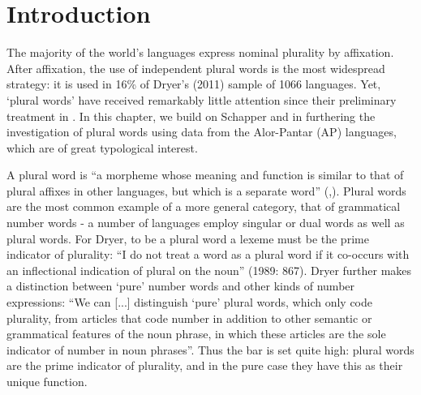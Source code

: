  
\section{Introduction}\label{sec:9:1}%
 
\hypertarget{Toc376962648}{}
The majority of the world's languages express nominal plurality by affixation. After affixation, the use of independent plural words is the most widespread strategy: it is used in 16\% of Dryer's (2011) sample of 1066 languages.\nocite{Dryer2011} Yet, `plural words' have received remarkably little attention since their preliminary treatment in \citet{Dryer1989}. In this chapter, we build on Schapper and \citet{Klamer2011} in furthering the investigation of plural words using data from the Alor-Pantar (AP) languages, which are of great typological interest.

A plural word is ``a morpheme whose meaning and function is similar to that of plural affixes in other languages, but which is a separate word'' (\citealt[865]{Dryer1989},\citealt[166]{Dryer2007}). Plural words are the most common example of a more general category, that of grammatical number words - a number of languages employ singular or dual words as well as plural words. For Dryer, to be a plural word a lexeme must be the prime indicator of plurality: ``I do not treat a word as a plural word if it co-occurs with an inflectional indication of plural on the noun'' (1989: 867). Dryer further makes a distinction between `pure' number words and other kinds of number expressions: ``We can [...] distinguish `pure' plural words, which only code plurality, from articles that code number in addition to other semantic or grammatical features of the noun phrase, in which these articles are the sole indicator of number in noun phrases''. Thus the bar is set quite high: plural words are the prime indicator of plurality, and in the
pure case they have this as their unique function.

